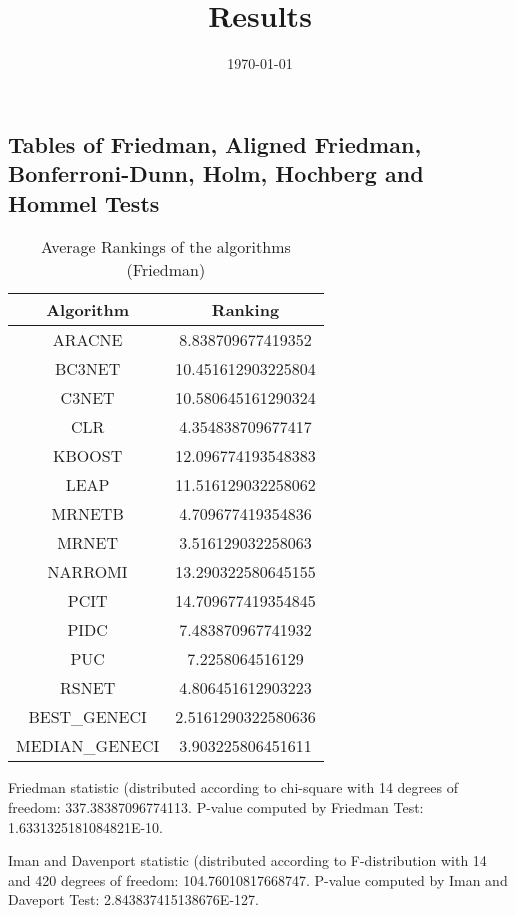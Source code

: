 \documentclass[a4paper,10pt]{article}
\title{Results}
\author{}
\date{\today}
\begin{document}
\begin{landscape}
\oddsidemargin 0in \topmargin 0in\maketitle
\section{Tables of Friedman, Aligned Friedman, Bonferroni-Dunn, Holm, Hochberg and Hommel Tests}
\begin{table}[!htp]
\centering
\caption{Average Rankings of the algorithms (Friedman)
}\begin{tabular}{c|c}
Algorithm&Ranking\\
\hline
ARACNE&8.838709677419352\\
BC3NET&10.451612903225804\\
C3NET&10.580645161290324\\
CLR&4.354838709677417\\
KBOOST&12.096774193548383\\
LEAP&11.516129032258062\\
MRNETB&4.709677419354836\\
MRNET&3.516129032258063\\
NARROMI&13.290322580645155\\
PCIT&14.709677419354845\\
PIDC&7.483870967741932\\
PUC&7.2258064516129\\
RSNET&4.806451612903223\\
BEST_GENECI&2.5161290322580636\\
MEDIAN_GENECI&3.903225806451611\\
\end{tabular}
\end{table}


Friedman statistic (distributed according to chi-square with 14 degrees of freedom: 337.38387096774113. 
P-value computed by Friedman Test: 1.6331325181084821E-10.\newline

Iman and Davenport statistic (distributed according to F-distribution with 14 and 420 degrees of freedom: 104.76010817668747. 
P-value computed by Iman and Daveport Test: 2.843837415138676E-127.\newline


\newpage


\end{landscape}
\end{document}
